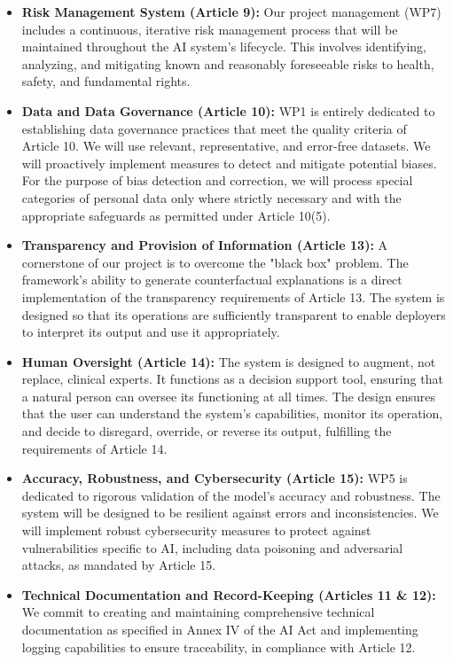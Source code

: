 \documentclass[11pt, a4paper]{article}
\begin{document}
\begin{itemize}
    \item \textbf{Risk Management System (Article 9):} Our project management (WP7) includes a continuous, iterative risk management process that will be maintained throughout the AI system's lifecycle. This involves identifying, analyzing, and mitigating known and reasonably foreseeable risks to health, safety, and fundamental rights.

    \item \textbf{Data and Data Governance (Article 10):} WP1 is entirely dedicated to establishing data governance practices that meet the quality criteria of Article 10. We will use relevant, representative, and error-free datasets. We will proactively implement measures to detect and mitigate potential biases. For the purpose of bias detection and correction, we will process special categories of personal data only where strictly necessary and with the appropriate safeguards as permitted under Article 10(5).

    \item \textbf{Transparency and Provision of Information (Article 13):} A cornerstone of our project is to overcome the "black box" problem. The framework's ability to generate counterfactual explanations is a direct implementation of the transparency requirements of Article 13. The system is designed so that its operations are sufficiently transparent to enable deployers to interpret its output and use it appropriately.

    \item \textbf{Human Oversight (Article 14):} The system is designed to augment, not replace, clinical experts. It functions as a decision support tool, ensuring that a natural person can oversee its functioning at all times. The design ensures that the user can understand the system's capabilities, monitor its operation, and decide to disregard, override, or reverse its output, fulfilling the requirements of Article 14.

    \item \textbf{Accuracy, Robustness, and Cybersecurity (Article 15):} WP5 is dedicated to rigorous validation of the model's accuracy and robustness. The system will be designed to be resilient against errors and inconsistencies. We will implement robust cybersecurity measures to protect against vulnerabilities specific to AI, including data poisoning and adversarial attacks, as mandated by Article 15.

    \item \textbf{Technical Documentation and Record-Keeping (Articles 11 \& 12):} We commit to creating and maintaining comprehensive technical documentation as specified in Annex IV of the AI Act and implementing logging capabilities to ensure traceability, in compliance with Article 12.
\end{itemize}
\end{document}
